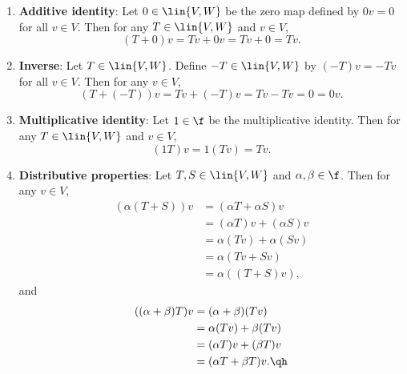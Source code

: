\begin{sol}
\begin{enumerate}
        \begin{align*}
            ((R + S) + T)v & = (R + S)v + Tv \\
            & = (Rv + Sv) + Tv \\
            & = Rv + (Sv + Tv) \\
            & = Rv + (S + T)v \\
            & = (R + (S + T))v.
        \end{align*}
        Similarly, for any $\alpha, \beta \in \f$ and $T \in \lin{V, W}$,
        \begin{align*}
            ((\alpha\beta)T)v & = (\alpha\beta)(Tv) \\
            & = \alpha(\beta Tv) \\
            & = \alpha(\beta T)v \\
            & = (\alpha(\beta T))v.
        \end{align*}
        \item \textbf{Additive identity}: Let $0 \in \lin{V, W}$ be the zero map defined by $0v = 0$ for all $v \in V$. Then for any $T \in \lin{V, W}$ and $v \in V$,
        \[(T + 0)v = Tv + 0v = Tv + 0 = Tv.\]
        \item \textbf{Inverse}: Let $T \in \lin{V, W}$. Define $-T \in \lin{V, W}$ by $(-T)v = -Tv$ for all $v \in V$. Then for any $v \in V$,
        \[(T + (-T))v = Tv + (-T)v = Tv - Tv = 0 = 0v.\]
        \item \textbf{Multiplicative identity}: Let $1 \in \f$ be the multiplicative identity. Then for any $T \in \lin{V, W}$ and $v \in V$,
        \[(1T)v = 1(Tv) = Tv.\]
        \item \textbf{Distributive properties}: Let $T, S \in \lin{V, W}$ and $\alpha, \beta \in \f$. Then for any $v \in V$,
        \begin{align*}
            (\alpha(T + S))v & = (\alpha T + \alpha S)v \\
            & = (\alpha T)v + (\alpha S)v \\
            & = \alpha(Tv) + \alpha(Sv) \\
            & = \alpha(Tv + Sv) \\
            & = \alpha((T + S)v),
        \end{align*}
        and
        \begin{align*}
            ((\alpha + \beta)T)v & = (\alpha + \beta)(Tv) \\
            & = \alpha(Tv) + \beta(Tv) \\
            & = (\alpha T)v + (\beta T)v \\
            & = (\alpha T + \beta T)v. \qh
        \end{align*}
    \end{enumerate}
\end{sol}

